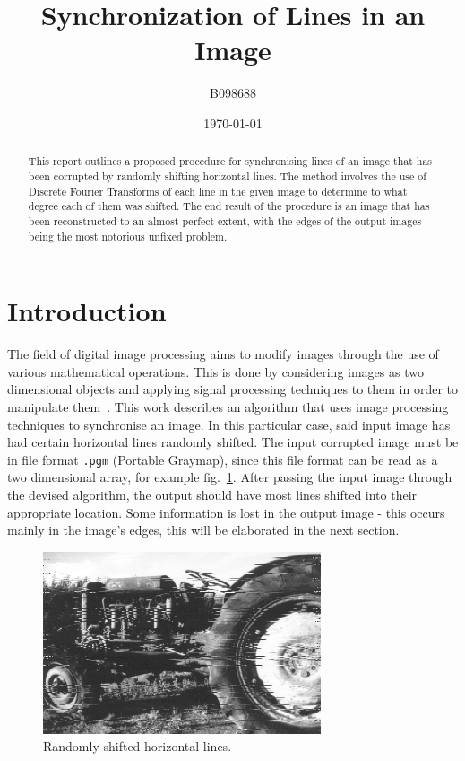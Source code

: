 \documentclass[a4paper,12pt]{article}
\title{Synchronization of Lines in an Image}
\author{B098688}
\date{\today}
\begin{document}
\maketitle

\begin{abstract}
 This report outlines a proposed procedure for synchronising lines of an image that has been corrupted by randomly shifting horizontal lines. The method involves the use of Discrete Fourier Transforms of each line in the given image to determine to what degree each of them was shifted. The end result of the procedure is an image that has been reconstructed to an almost perfect extent, with the edges of the output images being the most notorious unfixed problem.
\end{abstract}

\section{Introduction}

The field of digital image processing aims to modify images through the use of various mathematical operations. This is done by considering images as two dimensional objects and applying signal processing techniques to them in order to manipulate them~\cite{gonzalez1992digital}. This work describes an algorithm that uses image processing techniques to synchronise an image. In this particular case, said input image has had certain horizontal lines randomly shifted. The input corrupted image must be in file format \texttt{.pgm} (Portable Graymap), since this file format can be read as a two dimensional array, for example fig.~\ref{fig.1}. After passing the input image through the devised algorithm, the output should have most lines shifted into their appropriate location. Some information is lost in the output image - this occurs mainly in the image's edges, this will be elaborated in the next section.

\begin{figure}[h!]
\centering
\includegraphics[width=0.73\textwidth]{img/desync2}
\caption{Randomly shifted horizontal lines.}
\label{fig.1}
\end{figure}
\end{document}
